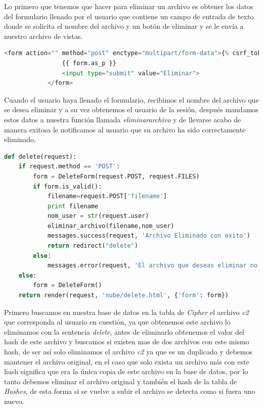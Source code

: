 Lo primero que tenemos que hacer para eliminar un archivo es obtener los datos del formulario llenado por el usuario que contiene un campo de entrada de texto donde se solicita el nombre del archivo y un botón de eliminar y se le envía a nuestro archivo de vistas.

\begin{lstlisting}[language=Python,frame=single, keywordstyle=\color{blue},breaklines=true, showstringspaces=false]
            <form action="" method="post" enctype="multipart/form-data">{% csrf_token %}
                {{ form.as_p }}
                <input type="submit" value="Eliminar">
            </form>
\end{lstlisting}

Cuando el usuario haya llenado el formulario, recibimos el nombre del archivo que se desea eliminar y a su vez obtenemos el usuario de la sesión, después mandamos estos datos a nuestra función llamada \textit{eliminararchivo} y de llevarse acabo de manera exitosa le notificamos al usuario que su archivo ha sido correctamente eliminado.

\begin{lstlisting}[language=Python,frame=single, keywordstyle=\color{blue},breaklines=true, showstringspaces=false]
def delete(request):
    if request.method == 'POST':
        form = DeleteForm(request.POST, request.FILES)
        if form.is_valid():
            filename=request.POST['filename']
            print filename
            nom_user = str(request.user)          
            eliminar_archivo(filename,nom_user)
            messages.success(request, 'Archivo Eliminado con exito')
            return redirect("delete")
        else:
            messages.error(request, 'El archivo que deseas eliminar no existe')
    else:
        form = DeleteForm()
    return render(request, 'nube/delete.html', {'form': form})
\end{lstlisting}

Primero buscamos en nuestra base de datos en la tabla de \textit{Cipher} el archivo \textit{c2} que corresponda al usuario en cuestión, ya que obtenemos este archivo lo eliminamos con la sentencia \textit{delete}, antes de eliminarlo obtenemos el valor del hash de este archivo y buscamos si existen mas de dos archivos con este mismo hash, de ser así solo eliminamos el archivo \textit{c2} ya que es un duplicado y debemos mantener el archivo original, en el caso que solo exista un archivo más con este hash significa que era la única copia de este archivo en la base de datos, por lo tanto debemos eliminar el archivo original y también el hash de la tabla de \textit{Hashes}, de esta forma si se vuelve a subir el archivo se detecta como si fuera uno nuevo.

